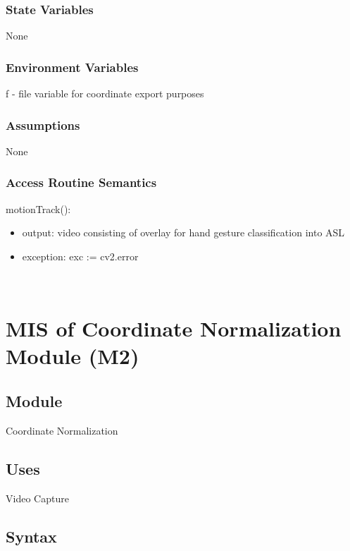 \documentclass[12pt, titlepage]{article}
\begin{document}
\subsubsection{State Variables}

None

\subsubsection{Environment Variables}

f - file variable for coordinate export purposes

\subsubsection{Assumptions}

None

\subsubsection{Access Routine Semantics}

\noindent motionTrack():
\begin{itemize}
\item output: video consisting of overlay for hand gesture classification into ASL\\
\item exception: exc := cv2.error
\end{itemize}

~\newpage

\section{MIS of Coordinate Normalization Module (M2)} \label{m2}

\subsection{Module}

Coordinate Normalization

\subsection{Uses}

Video Capture

\subsection{Syntax}
\end{document}
